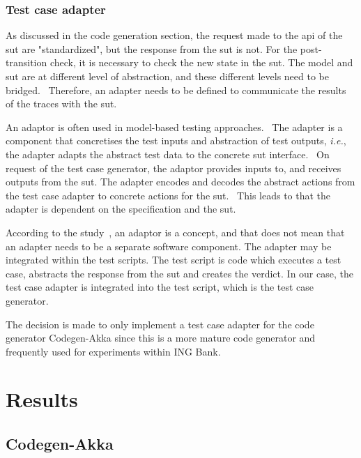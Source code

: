 \subsubsection{Test case adapter}\label{sec:ch5-adapter}
As discussed in the code generation section, the request made to the \gls{api} of the
\gls{sut} are "standardized", but the response from the \gls{sut} is not. For the
post-transition check, it is necessary to check the new state in the \gls{sut}.
The model and \gls{sut} are at different level of abstraction, and these
different levels need to be bridged.~\cite{utting2007practical}
Therefore, an adapter needs to be defined to communicate the results of the
traces with the \gls{sut}.

An adaptor is often used in model-based testing
approaches.~\cite{utting2012taxonomy, tretmans2003torx}
The adapter is a component that concretises the test inputs and abstraction of
test outputs, \textit{i.e.}, the adapter adapts the abstract test data to the
concrete \gls{sut} interface.~\cite[p.~4]{utting2012taxonomy}
On request of the test case generator, the adaptor provides inputs to, and
receives outputs from the \gls{sut}. The adapter encodes and decodes the
abstract actions from the test case adapter to concrete actions for the
\gls{sut}.~\cite[p.~5]{tretmans2003torx} This leads to that the adapter is
dependent on the specification and the \gls{sut}.

According to the study~\cite[p.~4]{utting2012taxonomy}, an adaptor is a concept,
and that does not mean that an adapter needs to be a separate software component.
The adapter may be integrated within the test scripts. The test script is code
which executes a test case, abstracts the response from the \gls{sut} and
creates the verdict. In our case, the test case adapter is integrated into the
test script, which is the test case generator.

The decision is made to only implement a test case adapter for the code generator
Codegen-Akka since this is a more mature code generator and frequently used for
experiments within ING Bank.

\section{Results}\label{sec:ch5-results}

\subsection{Codegen-Akka}\label{sec:ch5-run-codegenakka}

